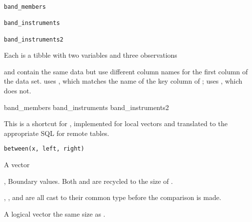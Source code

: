 \documentclass[a4paper]{book}
\begin{document}
%
\begin{Usage}
\begin{verbatim}
band_members

band_instruments

band_instruments2
\end{verbatim}
\end{Usage}
%
\begin{Format}
Each is a tibble with two variables and three observations
\end{Format}
%
\begin{Details}
 and  contain the same data but use
different column names for the first column of the data set.
 uses , which matches the name of the key column of
;  uses , which does not.
\end{Details}
%
\begin{Examples}
\begin{ExampleCode}
band_members
band_instruments
band_instruments2
\end{ExampleCode}
\end{Examples}
%
\begin{Description}
This is a shortcut for , implemented for local
vectors and translated to the appropriate SQL for remote tables.
\end{Description}
%
\begin{Usage}
\begin{verbatim}
between(x, left, right)
\end{verbatim}
\end{Usage}
%
\begin{Arguments}
\begin{ldescription}
\item[\code{x}] A vector

\item[\code{left}, \code{right}] Boundary values. Both  and  are recycled to
the size of .
\end{ldescription}
\end{Arguments}
%
\begin{Details}
, , and  are all cast to their common type before the
comparison is made.
\end{Details}
%
\begin{Value}
A logical vector the same size as .
\end{Value}
\end{document}
